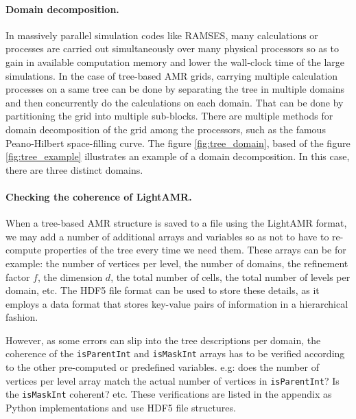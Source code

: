 \documentclass[
	a4paper,
	12pt,
	raggedright,
	twoside
]{tufte-style-article}
\theoremstyle{definition}
\theoremstyle{remark}
\begin{document}
\paragraph{Domain decomposition.} In massively parallel simulation codes like RAMSES, many calculations or processes are carried out simultaneously over many physical processors so as to gain in available computation memory and lower the wall-clock time of the large simulations. In the case of tree-based \Gls{AMR} grids, carrying multiple calculation processes on a same tree can be done by separating the tree in multiple domains and then concurrently do the calculations on each domain. That can be done by partitioning the grid into multiple sub-blocks. There are multiple methods for domain decomposition of the grid among the processors, such as the famous Peano-Hilbert
space-filling curve. The figure \ref{fig:tree_domain}, based of the figure \ref{fig:tree_example} illustrates an example of a domain decomposition. In this case, there are three distinct domains.
\begin{figure}
    \centering
    
\end{figure}

\paragraph{Checking the coherence of LightAMR.} When a tree-based \Gls{AMR} structure is saved to a file using the LightAMR format, we may add a number of additional arrays and variables so as not to have to re-compute properties of the tree every time we need them. These arrays can be for example: the number of vertices per level, the number of domains, the refinement factor $f$, the dimension $d$, the total number of cells, the total number of levels per domain, etc. The HDF5 file format can be used to store these details, as it employs a data format that stores key-value pairs of information in a hierarchical fashion.

However, as some errors can slip into the tree descriptions per domain, the coherence of the \texttt{isParentInt} and \texttt{isMaskInt} arrays has to be verified according to the other pre-computed or predefined variables. e.g: does the number of vertices per level array match the actual number of vertices in \texttt{isParentInt}? Is the \texttt{isMaskInt} coherent? etc. These verifications are listed in the appendix as Python implementations and use HDF5 file structures.
\end{document}
